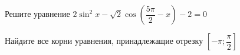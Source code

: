 \begin{ex}
	\begin{condition}
		\begin{enumcols}[label=\asbuk*)]
			\item Решите уравнение \( 2\sin^2 x - \sqrt{2}\cos{\left(\dfrac{5\pi}{2}-x\right)} - 2 = 0 \)
			\item Найдите все корни уравнения, принадлежащие отрезку \( \left[-\pi;\dfrac{\pi}{2}\right] \)
		\end{enumcols}
	\end{condition}
\end{ex}